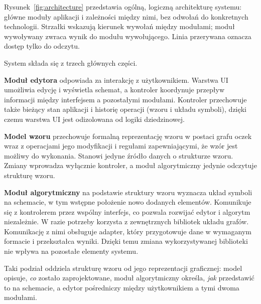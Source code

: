\documentclass[a4paper,11pt]{article}
\begin{document}
Rysunek~\ref{fig:architecture} przedstawia ogólną, logiczną architekturę systemu: główne moduły aplikacji i zależności między nimi, bez odwołań do konkretnych technologii. Strzałki wskazują kierunek wywołań między modułami; moduł wywoływany zwraca wynik do modułu wywołującego. Linia przerywana oznacza dostęp tylko do odczytu.

System składa się z trzech głównych części.

\textbf{Moduł edytora} odpowiada za interakcję z użytkownikiem. Warstwa UI umożliwia edycję i wyświetla schemat, a kontroler koordynuje przepływ informacji między interfejsem a pozostałymi modułami. Kontroler przechowuje także bieżący stan aplikacji i historię operacji (wzoru i układu symboli), dzięki czemu warstwa UI jest odizolowana od logiki dziedzinowej.

\textbf{Model wzoru} przechowuje formalną reprezentację wzoru w postaci grafu oczek wraz z operacjami jego modyfikacji i regułami zapewniającymi, że wzór jest możliwy do wykonania. Stanowi jedyne źródło danych o strukturze wzoru. Zmiany wprowadza wyłącznie kontroler, a moduł algorytmiczny jedynie odczytuje strukturę wzoru.

\textbf{Moduł algorytmiczny} na podstawie struktury wzoru wyznacza układ symboli na schemacie, w tym wstępne położenie nowo dodanych elementów. Komunikuje się z kontrolerem przez wspólny interfejs, co pozwala rozwijać edytor i algorytm niezależnie. W razie potrzeby korzysta z zewnętrznych bibliotek układu grafów. Komunikację z nimi obsługuje adapter, który przygotowuje dane w wymaganym formacie i przekształca wyniki. Dzięki temu zmiana wykorzystywanej biblioteki nie wpływa na pozostałe elementy systemu.

Taki podział oddziela strukturę wzoru od jego reprezentacji graficznej: model opisuje, \emph{co} zostało zaprojektowane, moduł algorytmiczny określa, \emph{jak} przedstawić to na schemacie, a edytor pośredniczy między użytkownikiem a tymi dwoma modułami.
\end{document}
